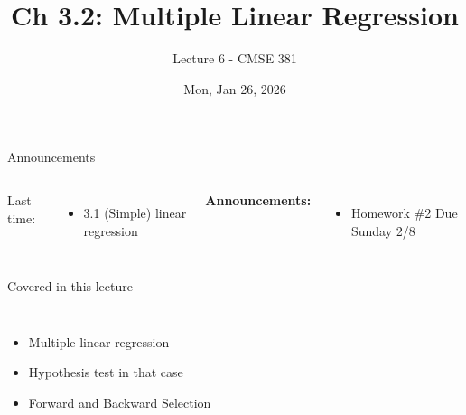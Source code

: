 \documentclass[aspectratio=169,usenames,dvipsnames]{beamer}
\begin{document}
\title[]{Ch 3.2: Multiple Linear Regression}
\subtitle{Lecture 6 - CMSE 381}
\date{Mon, Jan 26, 2026}




\begin{frame}
 \titlepage


\end{frame}
\begin{frame}[c]{Announcements}

\begin{columns}
\centering

	Last time:
	\begin{itemize}
		\item 3.1 (Simple) linear regression
	\end{itemize}
\centering

\textbf{Announcements:}
	\begin{itemize}
		\item Homework \#2 Due Sunday 2/8 %
	\end{itemize}
\end{columns}

\end{frame}
\begin{frame}[c]{Covered in this lecture }

\begin{columns}
\centering
\begin{itemize}
	\item Multiple linear regression
	\item Hypothesis test in that case
	\item Forward and Backward Selection
\end{itemize}
\centering

\end{columns}

\end{frame}
\end{document}
